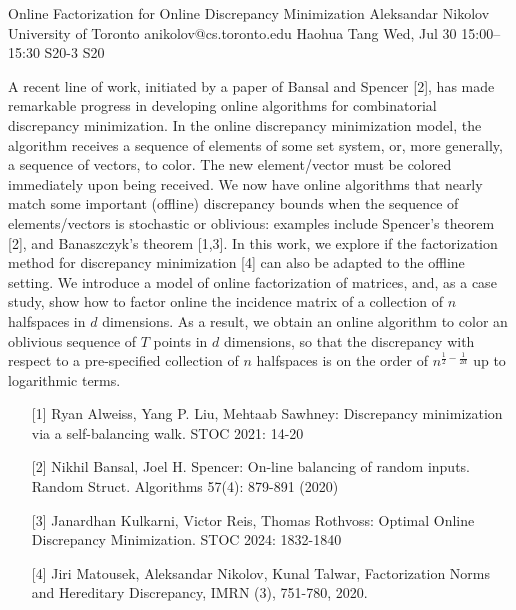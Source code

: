 \begin{talk}
  {Online Factorization for Online Discrepancy Minimization}%
  {Aleksandar Nikolov}%
  {University of Toronto}%
  {anikolov@cs.toronto.edu}%
  {Haohua Tang}%
  {}%
  {Wed, Jul 30 15:00–15:30}%
  {S20-3}%
  {S20}%
  
				
			
A recent line of work, initiated by a paper of Bansal and Spencer [2], has made remarkable progress in developing online algorithms for combinatorial discrepancy minimization. In the online discrepancy minimization model, the algorithm receives a sequence of elements of some set system, or, more generally, a sequence of vectors, to color. The new element/vector must be colored immediately upon being received. We now have online algorithms that nearly match some important (offline) discrepancy bounds when the sequence of elements/vectors is stochastic or oblivious: examples include Spencer's theorem [2], and Banaszczyk's theorem [1,3]. In this work, we explore if the factorization method for discrepancy minimization [4] can also be adapted to the offline setting. We introduce a model of online factorization of matrices, and, as a case study, show how to factor online the incidence matrix of a collection of $n$ halfspaces in $d$ dimensions. As a result, we obtain an online algorithm to color an oblivious sequence of $T$ points in $d$ dimensions, so that the discrepancy with respect to a pre-specified collection of $n$ halfspaces is on the order of $n^{\frac12 - \frac{1}{2d}}$ up to logarithmic terms. 

\medskip

\begin{enumerate}
    \item[{[1]}] Ryan Alweiss, Yang P. Liu, Mehtaab Sawhney:
Discrepancy minimization via a self-balancing walk. STOC 2021: 14-20

	\item[{[2]}] Nikhil Bansal, Joel H. Spencer:
On-line balancing of random inputs. Random Struct. Algorithms 57(4): 879-891 (2020)

    \item[{[3]}] Janardhan Kulkarni, Victor Reis, Thomas Rothvoss:
Optimal Online Discrepancy Minimization. STOC 2024: 1832-1840

    \item[{[4]}] Jiri Matousek, Aleksandar Nikolov, Kunal Talwar, Factorization Norms and Hereditary Discrepancy, IMRN (3), 751-780, 2020. 

\end{enumerate}
\end{talk}


